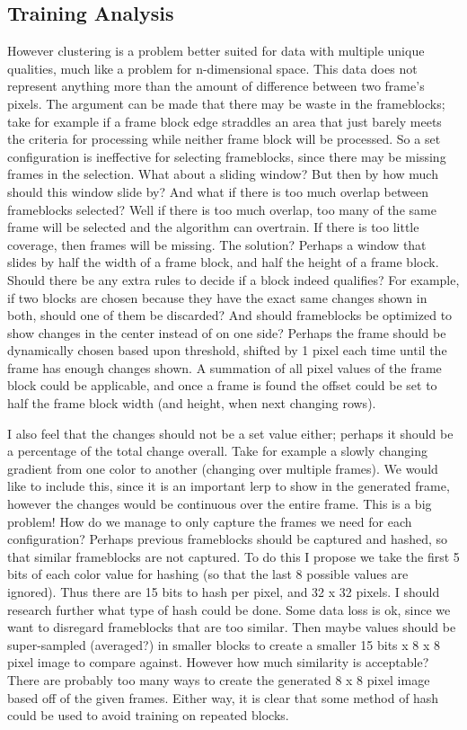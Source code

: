 \documentclass[conference]{IEEEtran}
\begin{document}
\subsection{Training Analysis}
\label{subsec:training_analysis}
However clustering is a problem better suited for data with multiple unique qualities,
much like a problem for n-dimensional space.
This data does not represent anything more than the amount of difference between two frame's pixels.
The argument can be made that there may be waste in the frameblocks; take for example if a
frame block edge straddles an area that just barely meets the criteria for processing while neither frame block will be processed.
So a set configuration is ineffective for selecting frameblocks, since there may be missing frames in the selection.
What about a sliding window? But then by how much should this window slide by? And what if there is too much overlap between frameblocks selected?
Well if there is too much overlap, too many of the same frame will be selected and the algorithm can overtrain.
If there is too little coverage, then frames will be missing.
The solution? Perhaps a window that slides by half the width of a frame block, and half the height of a frame block.
Should there be any extra rules to decide if a block indeed qualifies?
For example, if two blocks are chosen because they have the exact same changes shown in both, should one of them be discarded?
And should frameblocks be optimized to show changes in the center instead of on one side?
Perhaps the frame should be dynamically chosen based upon threshold, shifted by 1 pixel each time until the frame has enough changes shown.
A summation of all pixel values of the frame block could be applicable,
and once a frame is found the offset could be set to half the frame block width
(and height, when next changing rows).

I also feel that the changes should not be a set value either; perhaps it should be a percentage of the total change overall.
Take for example a slowly changing gradient from one color to another (changing over multiple frames).
We would like to include this, since it is an important lerp to show in the generated frame,
however the changes would be continuous over the entire frame. This is a big problem!
How do we manage to only capture the frames we need for each configuration?
Perhaps previous frameblocks should be captured and hashed, so that similar frameblocks are not captured.
To do this I propose we take the first 5 bits of each color value for hashing (so that the last 8 possible values are ignored).
Thus there are 15 bits to hash per pixel, and 32 x 32 pixels. I should research further what type of hash could be done.
Some data loss is ok, since we want to disregard frameblocks that are too similar.
Then maybe values should be super-sampled (averaged?) in smaller blocks to create a smaller 15 bits x 8 x 8 pixel image to compare against.
However how much similarity is acceptable? There are probably too many ways to create the generated 8 x 8 pixel image based off of the given frames.
Either way, it is clear that some method of hash could be used to avoid training on repeated blocks.
\end{document}
